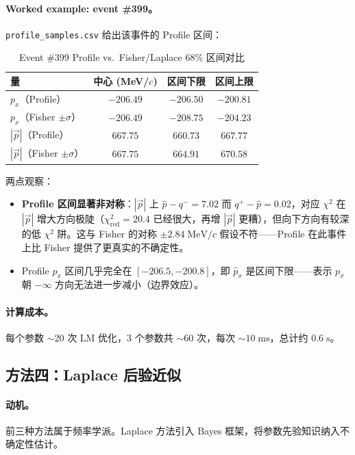 \documentclass[a4paper, 11pt]{article}
\begin{document}
\paragraph{Worked example: event \#399。}
\texttt{profile\_samples.csv} 给出该事件的 Profile 区间：
\begin{table}[H]
\centering
\caption{Event \#399 Profile vs.\ Fisher/Laplace 68\% 区间对比}
\label{tab:profile_event399}
\begin{tabular}{lccc}
\toprule
量 & 中心 (MeV/$c$) & 区间下限 & 区间上限 \\
\midrule
$p_x$（Profile） & $-206.49$ & $-206.50$ & $-200.81$ \\
$p_x$（Fisher $\pm \sigma$） & $-206.49$ & $-208.75$ & $-204.23$ \\
$|\vec{p}|$（Profile） & $667.75$ & $660.73$ & $667.77$ \\
$|\vec{p}|$（Fisher $\pm \sigma$） & $667.75$ & $664.91$ & $670.58$ \\
\bottomrule
\end{tabular}
\end{table}
两点观察：
\begin{itemize}[nosep]
  \item \textbf{Profile 区间显著非对称}：$|\vec{p}|$ 上 $\hat{p} - q^- = 7.02$ 而 $q^+ - \hat{p} = 0.02$，对应 $\chi^2$ 在 $|\vec{p}|$ 增大方向极陡（$\chi^2_\mathrm{red} = 20.4$ 已经很大，再增 $|\vec{p}|$ 更糟），但向下方向有较深的低 $\chi^2$ 阱。这与 Fisher 的对称 $\pm 2.84\;\mathrm{MeV}/c$ 假设不符——Profile 在此事件上比 Fisher 提供了更真实的不确定性。
  \item Profile $p_x$ 区间几乎完全在 $[-206.5, -200.8]$，即 $\hat{p}_x$ 是区间下限——表示 $p_x$ 朝 $-\infty$ 方向无法进一步减小（边界效应）。
\end{itemize}

\paragraph{计算成本。} 每个参数 $\sim$20 次 LM 优化，3 个参数共 $\sim 60$ 次，每次 $\sim 10\;\mathrm{ms}$，总计约 $0.6\;\mathrm{s}$。

\subsection{方法四：Laplace 后验近似}
\label{sec:laplace}

\paragraph{动机。}
前三种方法属于频率学派。Laplace 方法引入 Bayes 框架，将参数先验知识纳入不确定性估计。
\end{document}
